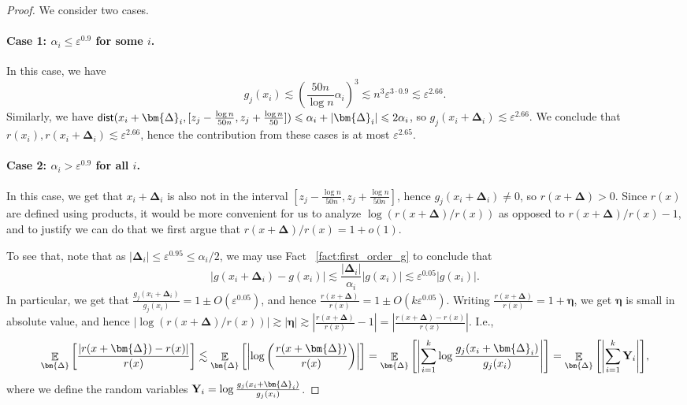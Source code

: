 \documentclass[10pt,a4paper]{article}
\newcommand\card[1]{\left| {#1} \right|}
\newcommand\Expect[2]{{\mathop{\mathbb{E}}_{#1}\left[ {#2} \right]}}
\newcommand\eps{\varepsilon}
\renewcommand\leq{\leqslant}
\renewcommand\le{\leqslant}
\newcommand{\al}{\alpha}
\newcommand{\De}{\Delta}
\newcommand{\ve}{\varepsilon}
\def\gg{\gtrsim}
\def\ll{\lesssim}
\begin{document}
\begin{proof}
	We consider two cases.
	
	\paragraph{Case 1: $\al_i\le \ve^{0.9}$ for some $i$.}
    In this case, we have
    \[
    g_j(x_i)\ll
    \left(\frac{50n}{\log n}\alpha_i\right)^3
    \ll n^3\eps^{3\cdot 0.9}
    \ll \eps^{2.66}.
    \]
    Similarly, we have ${\sf dist}(x_i+\bm{\De}_i,[z_j-\frac{\log n}{50n},z_j+\frac{\log n}{50}])
    \leq \alpha_i + \card{\bm{\De}_i}\leq 2\alpha_i$, so $g_j(x_i+\bm{\De}_i)\ll \eps^{2.66}$.
    We conclude that $r(x_i),r(x_i+\bm{\De}_i)\ll \eps^{2.66}$, hence the contribution from these cases is at most $\eps^{2.65}$.
	
	 \paragraph{Case 2: $\al_i>\ve^{0.9}$ for all $i$.} In this case, we get that $x_i+\bm{\De}_i$ is also not in
     the interval $[z_j-\frac{\log n}{50n},z_j+\frac{\log n}{50n}]$, hence $g_j(x_i+\bm{\De}_i)\neq 0$,
     so $r(x+\bm{\De})>0$. Since $r(x)$ are defined using products, it would be more convenient for us to analyze
     $\log(r(x+\bm{\De})/r(x))$ as opposed to $r(x+\bm{\De})/r(x)-1$, and to justify we can do that we first argue that
     $r(x+\bm{\De})/r(x) = 1+o(1)$.

     To see that, note that as $\card{\bm{\De}_i}\leq \eps^{0.95}\leq \alpha_i/2$, we may use Fact ~\ref{fact:first_order_g} to conclude that
     \[
     \card{g(x_i+\bm{\De}_i) - g(x_i)}
     \ll \frac{\card{\bm{\De}_i}}{\alpha_i} \card{g(x_i)}
     \ll \eps^{0.05} \card{g(x_i)}.
     \]
     In particular, we get that
     $\frac{g_j(x_i+\bm{\De}_i)}{g_j(x_i)} = 1\pm O(\eps^{0.05})$, and hence
     $\frac{r(x+\bm{\De})}{r(x)} = 1\pm O(k\eps^{0.05})$. Writing $\frac{r(x+\bm{\De})}{r(x)} = 1+\bm{\eta}$,
     we get $\bm{\eta}$ is small in absolute value, and hence
     $\card{\log(r(x+\bm{\De})/r(x))}\gg \card{\bm{\eta}}\gg \card{\frac{r(x+\bm{\De})}{r(x)} - 1} = \card{\frac{r(x+\bm{\De})-r(x)}{r(x)}}$.
     I.e.,
	 \begin{equation}
	 \Expect{\bm{\De}}{\frac{|r(x+\bm{\De})-r(x)|}{r(x)}}
     \ll \Expect{\bm{\De}}{\card{\log \left(\frac{r(x+\bm{\De})}{r(x)}\right)}}
     = \Expect{\bm{\De}}{\left|\sum_{i=1}^k \log \frac{ g_j(x_i+\bm{\De}_i)}{g_j(x_i)} \right|}
     = \Expect{\bm{\De}}{\left|\sum_{i=1}^k {\bf Y}_i \right|},
	 	  \label{eq:cl:A-4:1}
\end{equation}
	 where we define the random variables ${\bf Y}_i = \log \frac{ g_j(x_i+\bm{\De}_i)}{g_j(x_i)}$.


\end{proof}
\end{document}
